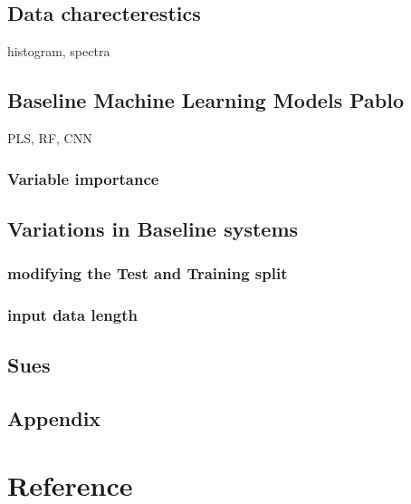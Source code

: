 \documentclass[12pt,a4paper]{report}
\begin{document}
\section{Data charecterestics}
histogram, spectra
\section{Baseline Machine Learning Models Pablo}
PLS, RF, CNN

\subsection{Variable importance}

\section{ Variations in Baseline systems}
\subsection{ modifying the Test and Training split}
\subsection{ input data length}

\section{Sues}

\section{Appendix}


\chapter{Reference}
\end{document}
